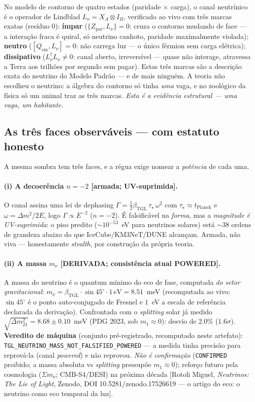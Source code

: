 \documentclass[11pt]{article}
\newcommand{\bTGL}{\beta_{\mathrm{TGL}}}\newcommand{\Msun}{M_{\odot}}\newcommand{\TGL}{\mathrm{TGL}}
\theoremstyle{definition}\newtheorem{deriv}{Derivação}
\begin{document}
No modelo de contorno de quatro estados (paridade $\times$ carga), o canal neutrínico é o operador de Lindblad $L_\nu=X_A\otimes I_B$, verificado ao vivo com três marcas exatas (resíduo $0$): \textbf{ímpar} ($\{Z_{\text{par}},L_\nu\}=0$: cruza o contorno mudando de face --- a interação fraca é quiral, só neutrino canhoto, paridade maximalmente violada); \textbf{neutro} ($[Q_{\text{em}},L_\nu]=0$: não carrega luz --- o único férmion sem carga elétrica); \textbf{dissipativo} ($L_\nu^\dagger L_\nu\neq0$: canal aberto, irreversível --- quase não interage, atravessa a Terra aos trilhões por segundo sem pagar). Estas três marcas são a descrição exata do neutrino do Modelo Padrão --- e de mais ninguém. A teoria não escolheu o neutrino: a álgebra do contorno só tinha \emph{uma} vaga, e no zoológico da física só um animal traz as três marcas. \emph{Esta é a evidência estrutural --- uma vaga, um habitante.}

\subsection*{As três faces observáveis --- com estatuto honesto}

A mesma sombra tem três faces, e a régua exige nomear a \emph{potência} de cada uma.

\paragraph{(i) A decoerência $n=-2$ \textsf{[armada; UV-suprimida].}} O canal assina uma lei de dephasing $\Gamma=\tfrac12\bTGL\,\tau_\star\,\omega^2$ com $\tau_\star\approx t_{\text{Planck}}$ e $\omega=\Delta m^2/2E$, logo $\Gamma\propto E^{-2}$ ($n=-2$). É falsificável na \emph{forma}, mas a \emph{magnitude é UV-suprimida}: o piso predito ($\sim10^{-53}$~eV para neutrinos solares) está $\sim38$ ordens de grandeza abaixo do que IceCube/KM3NeT/DUNE alcançam. Armada, não viva --- honestamente \emph{stealth}, por construção da própria teoria.

\paragraph{(ii) A massa $m_\nu$ \textsf{[DERIVADA; consistência atual POWERED].}} A massa do neutrino é o quantum mínimo do eco de fase, computada \emph{do setor gravitacional}: $m_\nu=\bTGL\cdot\sin45^\circ\cdot1\,\text{eV}=8.51$~meV (recomputada ao vivo; $\sin45^\circ$ é o ponto auto-conjugado de Fresnel e $1$~eV a escala de referência declarada da derivação). Confrontada com o \emph{splitting} solar já medido $\sqrt{\Delta m^2_{21}}=8.68\pm0.10$~meV (PDG 2023, sob $m_1\!\approx\!0$): desvio de $2.0\%$ ($1.6\sigma$). \textbf{Veredito de máquina} (conjunto pré-registrado, recomputado neste artefato): \texttt{TGL\_NEUTRINO\_MASS\_NOT\_FALSIFIED\_POWERED} --- a medida tinha precisão para reprová-la (canal \emph{powered}) e não reprovou. \emph{Não é confirmação} (\texttt{CONFIRMED} proibido; a massa absoluta vs \emph{splitting} pressupõe $m_1\!\approx\!0$); reforço futuro pela cosmologia ($\Sigma m_\nu$; CMB-S4/DESI) na próxima década [Rotoli Miguel, \emph{Neutrinos: The Lie of Light}, Zenodo, DOI 10.5281/zenodo.17526619 --- o artigo do eco: o neutrino como eco temporal da luz].
\end{document}
